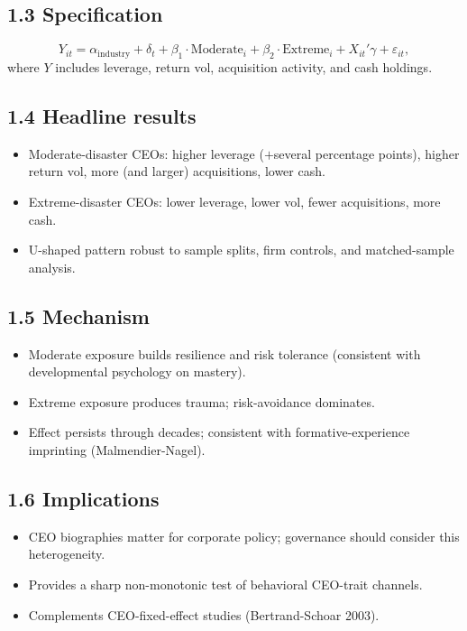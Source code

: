 \documentclass[11pt]{article}
\begin{document}
\subsection*{1.3 Specification}
\[
Y_{it}=\alpha_{\text{industry}}+\delta_t+\beta_1\cdot\text{Moderate}_i+\beta_2\cdot\text{Extreme}_i+X_{it}'\gamma+\varepsilon_{it},
\]
where $Y$ includes leverage, return vol, acquisition activity, and cash holdings.

\subsection*{1.4 Headline results}
\begin{itemize}
\item Moderate-disaster CEOs: higher leverage ($+$several percentage points), higher return vol, more (and larger) acquisitions, lower cash.
\item Extreme-disaster CEOs: lower leverage, lower vol, fewer acquisitions, more cash.
\item U-shaped pattern robust to sample splits, firm controls, and matched-sample analysis.
\end{itemize}

\subsection*{1.5 Mechanism}
\begin{itemize}
\item Moderate exposure builds resilience and risk tolerance (consistent with developmental psychology on mastery).
\item Extreme exposure produces trauma; risk-avoidance dominates.
\item Effect persists through decades; consistent with formative-experience imprinting (Malmendier-Nagel).
\end{itemize}

\subsection*{1.6 Implications}
\begin{itemize}
\item CEO biographies matter for corporate policy; governance should consider this heterogeneity.
\item Provides a sharp non-monotonic test of behavioral CEO-trait channels.
\item Complements CEO-fixed-effect studies (Bertrand-Schoar 2003).
\end{itemize}
\end{document}
